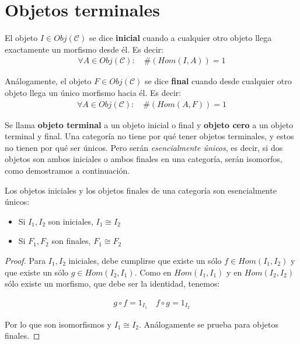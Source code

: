 \documentclass[11pt, fleqn, spanish]{book}
\newcommand{\C}{\mathcal{C}}
\begin{document}
\section {Objetos terminales}
\begin{definition}
  El objeto $I \in Obj(\C)$ se dice \textbf{inicial} cuando a cualquier otro objeto llega
  exactamente un morfismo desde él. Es decir:
  \begin{gather*}
    \forall A \in Obj(\C):\quad \#(Hom(I,A)) = 1
  \end{gather*}
\end{definition}

\begin{definition}
  Análogamente, el objeto $F \in Obj(\C)$ se dice \textbf{final}
  cuando desde cualquier otro objeto llega un único morfismo hacia
  él. Es decir:
  \begin{gather*}
    \forall A \in Obj(\C):\quad \#(Hom(A,F)) = 1
  \end{gather*}
\end{definition}
   
Se llama \textbf{objeto terminal} a un objeto inicial o final y
\textbf{objeto cero} a un objeto terminal y final. Una categoría no
tiene por qué tener objetos terminales, y estos no tienen por qué ser
únicos. Pero serán \textit{esencialmente únicos}, es decir, si dos
objetos son ambos iniciales o ambos finales en una categoría, serán
isomorfos, como demostramos a continuación.
    
\begin{theorem}
Los objetos iniciales y los objetos finales de una
categoría son esencialmente únicos:

  \begin{itemize}
  \item Si $I_1,I_2$ son iniciales, $I_1 \cong I_2$
  \item Si $F_1,F_2$ son finales, $F_1 \cong F_2$
  \end{itemize}
\end{theorem}

\begin{proof}
  Para $I_1,I_2$ iniciales, debe cumplirse que existe un sólo
  $f \in Hom(I_1,I_2)$ y que existe un sólo $g \in Hom(I_2,I_1)$. Como
  en $Hom(I_1,I_1)$ y en $Hom(I_2,I_2)$ sólo existe un morfismo, que
  debe ser la identidad, tenemos:
  
  \begin{gather*}
    g \circ f = 1_{I_1} \quad f \circ g = 1_{I_2}
  \end{gather*}
  
  Por lo que son isomorfismos y $I_1 \cong I_2$. Análogamente se prueba para objetos finales.
\end{proof}
    
\end{document}
